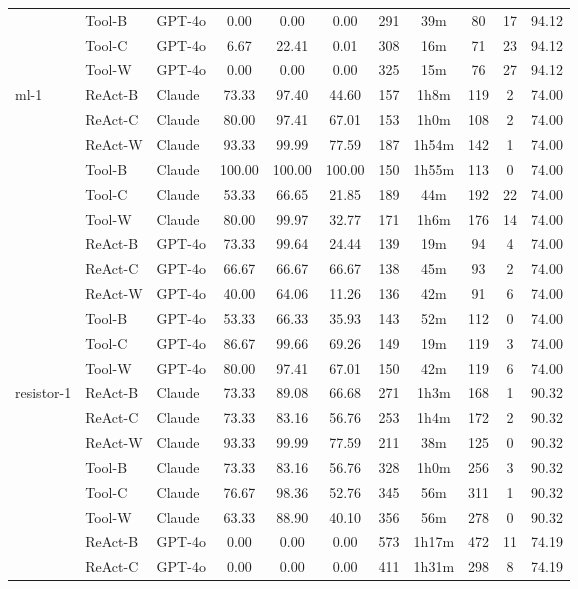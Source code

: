 \begin{longtable}{lllcccccccc}
 & Tool-B & GPT-4o & 0.00 & 0.00 & 0.00 & 291 & 39m & 80 & 17 & 94.12 \\
 & Tool-C & GPT-4o & 6.67 & 22.41 & 0.01 & 308 & 16m & 71 & 23 & 94.12 \\
 & Tool-W & GPT-4o & 0.00 & 0.00 & 0.00 & 325 & 15m & 76 & 27 & 94.12 \\
ml-1 & ReAct-B & Claude & 73.33 & 97.40 & 44.60 & 157 & 1h8m & 119 & 2 & 74.00 \\
 & ReAct-C & Claude & 80.00 & 97.41 & 67.01 & 153 & 1h0m & 108 & 2 & 74.00 \\
 & ReAct-W & Claude & 93.33 & 99.99 & 77.59 & 187 & 1h54m & 142 & 1 & 74.00 \\
 & Tool-B & Claude & 100.00 & 100.00 & 100.00 & 150 & 1h55m & 113 & 0 & 74.00 \\
 & Tool-C & Claude & 53.33 & 66.65 & 21.85 & 189 & 44m & 192 & 22 & 74.00 \\
 & Tool-W & Claude & 80.00 & 99.97 & 32.77 & 171 & 1h6m & 176 & 14 & 74.00 \\
 & ReAct-B & GPT-4o & 73.33 & 99.64 & 24.44 & 139 & 19m & 94 & 4 & 74.00 \\
 & ReAct-C & GPT-4o & 66.67 & 66.67 & 66.67 & 138 & 45m & 93 & 2 & 74.00 \\
 & ReAct-W & GPT-4o & 40.00 & 64.06 & 11.26 & 136 & 42m & 91 & 6 & 74.00 \\
 & Tool-B & GPT-4o & 53.33 & 66.33 & 35.93 & 143 & 52m & 112 & 0 & 74.00 \\
 & Tool-C & GPT-4o & 86.67 & 99.66 & 69.26 & 149 & 19m & 119 & 3 & 74.00 \\
 & Tool-W & GPT-4o & 80.00 & 97.41 & 67.01 & 150 & 42m & 119 & 6 & 74.00 \\
resistor-1 & ReAct-B & Claude & 73.33 & 89.08 & 66.68 & 271 & 1h3m & 168 & 1 & 90.32 \\
 & ReAct-C & Claude & 73.33 & 83.16 & 56.76 & 253 & 1h4m & 172 & 2 & 90.32 \\
 & ReAct-W & Claude & 93.33 & 99.99 & 77.59 & 211 & 38m & 125 & 0 & 90.32 \\
 & Tool-B & Claude & 73.33 & 83.16 & 56.76 & 328 & 1h0m & 256 & 3 & 90.32 \\
 & Tool-C & Claude & 76.67 & 98.36 & 52.76 & 345 & 56m & 311 & 1 & 90.32 \\
 & Tool-W & Claude & 63.33 & 88.90 & 40.10 & 356 & 56m & 278 & 0 & 90.32 \\
 & ReAct-B & GPT-4o & 0.00 & 0.00 & 0.00 & 573 & 1h17m & 472 & 11 & 74.19 \\
 & ReAct-C & GPT-4o & 0.00 & 0.00 & 0.00 & 411 & 1h31m & 298 & 8 & 74.19 \\

\end{longtable}
